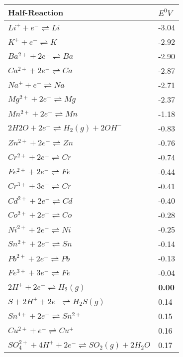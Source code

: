 \begin{table}
\begin{center}
\begin{tabular}{|l|l|}\hline 
\textbf{Half-Reaction}
&
\textbf{$E^{0}V$} \\ \hline\hline
$Li^{+} + e^{-} \rightleftharpoons Li$ & -3.04 \\ \hline
$K^{+} + e^{-} \rightleftharpoons K $& -2.92 \\ \hline
$Ba^{2+} + 2e^{-} \rightleftharpoons Ba $& -2.90 \\ \hline
$Ca^{2+} + 2e^{-} \rightleftharpoons Ca $& -2.87 \\ \hline
$Na^{+} + e^{-} \rightleftharpoons Na $& -2.71 \\ \hline
$Mg^{2+} + 2e^{-} \rightleftharpoons Mg $& -2.37 \\ \hline
$Mn^{2+} + 2e^{-} \rightleftharpoons Mn $& -1.18 \\ \hline
$2H2O + 2e^{-} \rightleftharpoons H_{2} (g) + 2 OH^{-} $& -0.83 \\ \hline
$Zn^{2+} + 2e^{-} \rightleftharpoons Zn $& -0.76 \\ \hline
$Cr^{2+} + 2e^{-} \rightleftharpoons Cr $& -0.74 \\ \hline
$Fe^{2+} + 2e^{-} \rightleftharpoons Fe $& -0.44 \\ \hline
$Cr^{3+} + 3e^{-} \rightleftharpoons Cr $& -0.41 \\ \hline
$Cd^{2+} + 2e^{-} \rightleftharpoons Cd $& -0.40\\ \hline
$Co^{2+} + 2e^{-} \rightleftharpoons Co $& -0.28 \\ \hline
$Ni^{2+} + 2e^{-} \rightleftharpoons Ni $& -0.25 \\ \hline
$Sn^{2+} + 2e^{-} \rightleftharpoons Sn $& -0.14 \\ \hline
$Pb^{2+} + 2e^{-} \rightleftharpoons Pb $& -0.13 \\ \hline
$Fe^{3+} + 3e^{-} \rightleftharpoons Fe $& -0.04 \\ \hline
$2H^{+} + 2e^{-} \rightleftharpoons H_{2} (g) $& \textbf{0.00} \\ \hline
$S + 2H^{+} + 2e^{-} \rightleftharpoons H_{2}S (g) $& 0.14 \\ \hline
$Sn^{4+} + 2e^{-} \rightleftharpoons Sn^{2+} $& 0.15 \\ \hline
$Cu^{2+} + e^{-} \rightleftharpoons Cu^{+} $& 0.16 \\ \hline
$SO_{4}^{2+} + 4H^{+} + 2e^{-} \rightleftharpoons SO_{2} (g) + 2H_{2}O $& 0.17 \\ \hline

\end{tabular}
\end{center}
\end{table}
